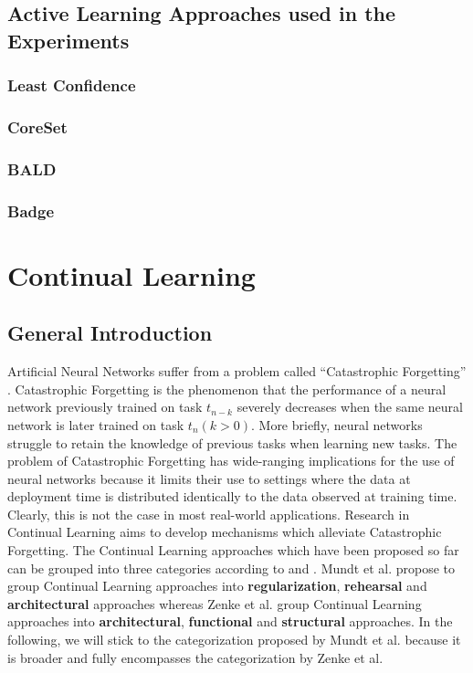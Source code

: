 \subsection{Active Learning Approaches used in the Experiments}
\subsubsection{Least Confidence}
\subsubsection{CoreSet}
\subsubsection{BALD}
\subsubsection{Badge}

\section{Continual Learning}
\label{sec:Related_work:Continual_Learning}
\subsection{General Introduction}
Artificial Neural Networks suffer from a problem called \enquote{Catastrophic Forgetting} \cite{mccloskey1989catastrophic}. Catastrophic Forgetting
is the phenomenon that the performance of a neural network previously trained on task $t_{n-k}$ severely decreases when the same neural network is later
trained on task $t_n (k>0)$. More briefly, neural networks struggle to retain the knowledge of previous tasks when learning new tasks. The problem of Catastrophic Forgetting
has wide-ranging implications for the use of neural networks because it limits their use to settings where the data at deployment time is distributed identically to the data
observed at training time. Clearly, this is not the case in most real-world applications. Research in Continual Learning aims to develop mechanisms which alleviate Catastrophic Forgetting.
The Continual Learning approaches which have been proposed so far can be grouped into three categories according to \cite{mundt2020wholistic} and \cite{zenke2017continual}. Mundt et al. \cite{mundt2020wholistic} propose
to group Continual Learning approaches into \textbf{regularization}, \textbf{rehearsal} and \textbf{architectural} approaches whereas Zenke et al. \cite{zenke2017continual} group Continual Learning approaches into \textbf{architectural},
\textbf{functional} and \textbf{structural} approaches. In the following, we will stick to the categorization proposed by Mundt et al. because it is broader and fully encompasses the categorization by Zenke et al.
